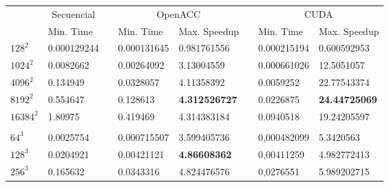 \begin{table}[H]
    \centering
    \begin{tabular}{llllllll}
    \multicolumn{1}{c}{} & \multicolumn{1}{c}{Secuencial} & \multicolumn{1}{c}{} & \multicolumn{2}{c}{OpenACC}        & \multicolumn{1}{c}{} & \multicolumn{2}{c}{CUDA}            \\ 
    \cline{2-2}\cline{4-5}\cline{7-8}
                         & Min. Time                      &                      & Min. Time   & Max. Speedup         &                      & Min. Time   & Max. Speedup          \\
    $128^2$                & 0.000129244                    &                      & 0.000131645 & 0.981761556          &                      & 0.000215194 & 0.600592953           \\
    $1024^2$                & 0.0082662                      &                      & 0.00264092  & 3.13004559           &                      & 0.000661026 & 12.5051057            \\
    $4096^2$                & 0.134949                       &                      & 0.0328057   & 4.11358392           &                      & 0.0059252   & 22.77543374           \\
    $8192^2$                & 0.554647                       &                      & 0.128613    & \textbf{4.312526727} &                      & 0.0226875   & \textbf{24.44725069}  \\
    $16384^2$                & 1.80975                        &                      & 0.419469    & 4.314383184          &                      & 0.0940518   & 19.24205597           \\
                    &                                &                      &             &                      &                      &             &                       \\
    $64^3$                & 0.0025754                      &                      & 0.000715507 & 3.599405736          &                      & 0,000482099  & 5.3420563             \\
    $128^3$                & 0.0204921                      &                      & 0.00421121  & \textbf{4.86608362}  &                      & 0,00411259  & 4.982772413           \\
    $256^3$                & 0.165632                       &                      & 0.0343316   & 4.824476576          &                      & 0,0276551 & 5.989202715           \\

\end{tabular}
\end{table}
